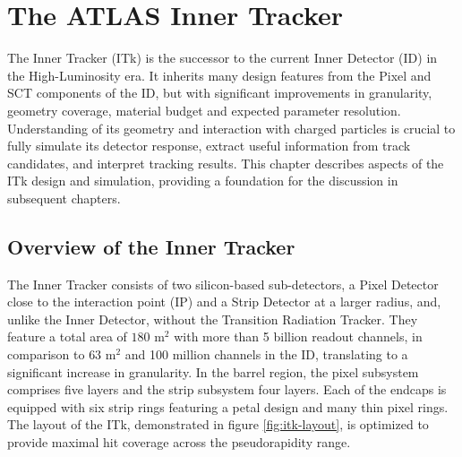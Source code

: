 
\chapter{The ATLAS Inner Tracker}
\label{chap:itk}
The Inner Tracker (ITk) is the successor to the current Inner Detector (ID) in the High-Luminosity era.
It inherits many design features from the Pixel and SCT components of the ID, but with significant improvements in granularity, geometry coverage, material budget and expected parameter resolution. 
Understanding of its geometry and interaction with charged particles is crucial to fully simulate its detector response, extract useful information from track candidates, and interpret tracking results.
This chapter describes aspects of the ITk design and simulation, providing a foundation for the discussion in subsequent chapters. 

\section{Overview of the Inner Tracker}
\label{sect:itk-overview}

The Inner Tracker consists of two silicon-based sub-detectors, a Pixel Detector close to the interaction point (IP) and a Strip Detector at a larger radius, and, unlike the Inner Detector, without the Transition Radiation Tracker. 
They feature a total area of $180$ $\mathrm{m}^2$ with more than 5 billion readout channels, in comparison to $63$ $\mathrm{m}^2$ and 100 million channels in the ID, translating to a significant increase in granularity. 
In the barrel region, the pixel subsystem comprises five layers and the strip subsystem four layers.
Each of the endcaps is equipped with six strip rings featuring a petal design and many thin pixel rings. 
The layout of the ITk, demonstrated in figure \ref{fig:itk-layout}, is optimized to provide maximal hit coverage across the pseudorapidity range. 

